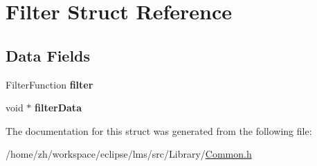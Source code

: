 \hypertarget{structFilter}{\section{Filter Struct Reference}
\label{structFilter}
}
\subsection*{Data Fields}
\begin{DoxyCompactItemize}
\item 
\hypertarget{structFilter_af7a4d06f1c38dd9234cb5ff044c9e739}{Filter\-Function {\bfseries filter}}\label{structFilter_af7a4d06f1c38dd9234cb5ff044c9e739}

\item 
\hypertarget{structFilter_a76700c71c75772c1bc1ff1f57dea861e}{void $\ast$ {\bfseries filter\-Data}}\label{structFilter_a76700c71c75772c1bc1ff1f57dea861e}

\end{DoxyCompactItemize}


The documentation for this struct was generated from the following file\-:\begin{DoxyCompactItemize}
\item 
/home/zh/workspace/eclipse/lms/src/\-Library/\hyperlink{Common_8h}{Common.\-h}\end{DoxyCompactItemize}
